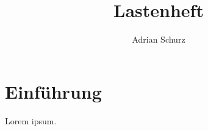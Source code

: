 \documentclass[11pt]{article}
\author{Adrian Schurz}
\title{Lastenheft}
\begin{document}
\maketitle
{}
\newpage
{}
\tableofcontents

\section{Einführung}
Lorem ipsum.
\end{document}
